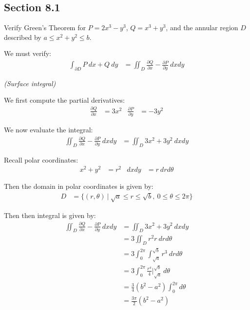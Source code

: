 \subsection{Section 8.1}

\begin{tcolorbox}[
        title={Problem 17},
        valign=center,
        nobeforeafter,
        colframe=gray!95!black
    ]
    Verify Green's Theorem for \(P = 2x^3 - y^3\), \(Q = x^3 + y^3\), and the annular region \(D\) described by \(a \leq x^2 + y^2 \leq b\).
\end{tcolorbox}

We must verify:
\begin{align}
    \int_{\partial D} P \ dx + Q \ dy &= \iint_D \frac{\partial Q}{\partial x} - \frac{\partial P}{\partial y} \ dxdy 
\end{align}
\begin{solution}
    \textit{(Surface integral)}
    
    We first compute the partial derivatives:
    \begin{align*}
        \frac{\partial Q}{\partial x} &= 3x^2 & \frac{\partial P}{\partial y} &= -3y^2
    \end{align*}
    
    We now evaluate the integral:
    \begin{align*}
        \iint_D \frac{\partial Q}{\partial x} - \frac{\partial P}{\partial y} \ dxdy &= \iint_D 3x^2 + 3y^2 \ dxdy 
    \end{align*}
    
    Recall polar coordinates:
    \begin{align*}
        x^2 + y^2 &= r^2 & dxdy &= r \ dr d\theta
    \end{align*}
    
    Then the domain in polar coordinates is given by:
    \begin{align}
        D &= \{(r, \theta) \ | \ \sqrt{a} \leq r \leq \sqrt{b}, \ 0 \leq \theta \leq 2\pi\}
    \end{align}
    
    Then then integral is given by:
    \begin{align*}
        \iint_D \frac{\partial Q}{\partial x} - \frac{\partial P}{\partial y} \ dxdy &= \iint_D 3x^2 + 3y^2 \ dxdy \\
        &= 3\iint_D r^2 r \ dr d\theta \\
        &= 3\int_0^{2\pi} \int_{\sqrt{a}}^{\sqrt{b}} r^3 \ dr d\theta \\
        &= 3\int_0^{2\pi} \frac{r^4}{4} \Biggr|_{\sqrt{a}}^{\sqrt{b}} \ d\theta \\
        &= \frac{3}{4}(b^2 - a^2) \int_0^{2\pi} d\theta \\
        &= \frac{3\pi}{2}(b^2 - a^2)
    \end{align*}
\end{solution}

